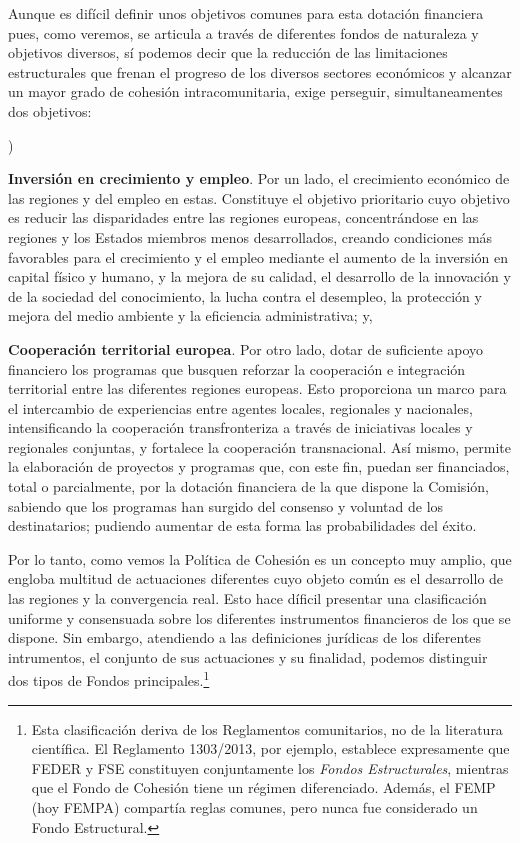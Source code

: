 \documentclass[10pt,a4paper]{article}
\newcounter{alphaitem}
\newenvironment{la}
      {\begin{list}{\alph{alphaitem})}{%
          \usecounter{alphaitem}%
          \setlength{\leftmargin}{1cm}%
          \setlength{\parskip}{3pt}%
          \setlength{\itemsep}{0pt}%
          \setlength{\parsep}{0pt}%
      }}
      {\end{list}}
\begin{document}
Aunque es difícil definir unos objetivos comunes para esta dotación financiera pues, como veremos, se articula a través de diferentes fondos de naturaleza y objetivos diversos, sí podemos decir que la reducción de las limitaciones estructurales que frenan el progreso de los diversos sectores económicos y alcanzar un mayor grado de cohesión intracomunitaria, exige perseguir, simultaneamentes dos objetivos: 
\begin{la}
    \item \textbf{Inversión en crecimiento y empleo}. Por un lado, el crecimiento económico de las regiones y del empleo en estas. Constituye el objetivo prioritario cuyo objetivo es reducir las disparidades entre las regiones europeas, concentrándose en las regiones y los Estados miembros menos desarrollados, creando condiciones más favorables para el crecimiento y el empleo mediante el aumento de la inversión en capital físico y humano, y la mejora de su calidad, el desarrollo de la innovación y de la sociedad del conocimiento, la lucha contra el desempleo, la protección y mejora del medio ambiente y la eficiencia administrativa; y,
    \item \textbf{Cooperación territorial europea}. Por otro lado, dotar de suficiente apoyo financiero los programas que busquen reforzar la cooperación e integración territorial entre las diferentes regiones europeas. Esto proporciona un marco para el intercambio de experiencias entre agentes locales, regionales y nacionales, intensificando la cooperación transfronteriza a través de iniciativas locales y regionales conjuntas, y fortalece la cooperación transnacional. Así mismo, permite la elaboración de proyectos y programas que, con este fin, puedan ser financiados, total o parcialmente, por la dotación financiera de la que dispone la Comisión, sabiendo que los programas han surgido del consenso y voluntad de los destinatarios; pudiendo aumentar de esta forma las probabilidades del éxito.
\end{la}

Por lo tanto, como vemos la Política de Cohesión es un concepto muy amplio, que engloba multitud de actuaciones diferentes cuyo objeto común es el desarrollo de las regiones y la convergencia real. Esto hace díficil presentar una clasificación uniforme y consensuada sobre los diferentes instrumentos financieros de los que se dispone. Sin embargo, atendiendo a las definiciones jurídicas de los diferentes intrumentos, el conjunto de sus actuaciones y su finalidad, podemos distinguir dos tipos de Fondos principales.\footnote{%
    Esta clasificación deriva de los Reglamentos comunitarios, no de la literatura científica. El Reglamento 1303/2013, por ejemplo, establece expresamente que FEDER y FSE constituyen conjuntamente los \textit{Fondos Estructurales}, mientras que el Fondo de Cohesión tiene un régimen diferenciado. Además, el FEMP (hoy FEMPA) compartía reglas comunes, pero nunca fue considerado un Fondo Estructural.
}
\end{document}

